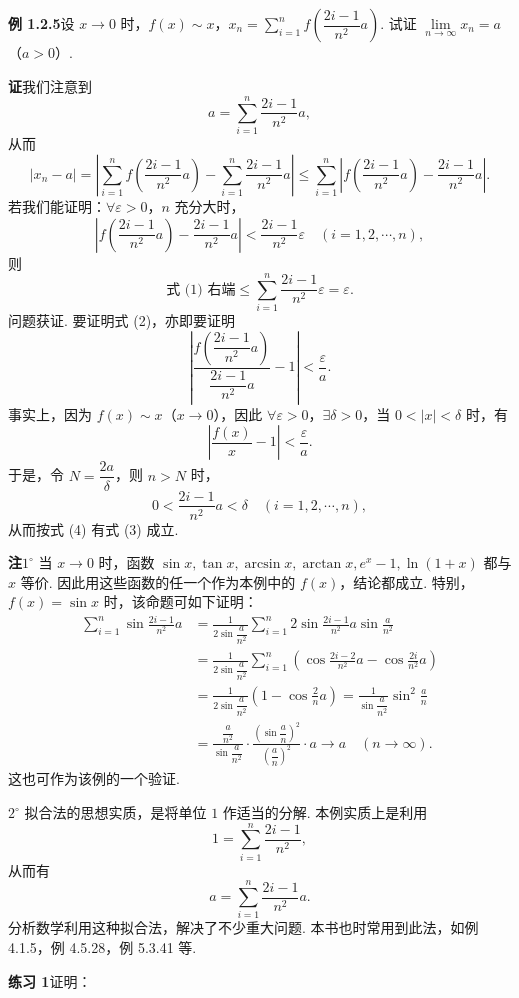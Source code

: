 \documentclass[UTF8,12pt,a4paper,fontset=fandol]{ctexart}
\begin{document}
\noindent\textbf{例 1.2.5}\quad 设 $x\to0$ 时，$f(x)\sim x$，$x_n=\sum\limits_{i=1}^n f\left(\dfrac{2i-1}{n^2}a\right)$. 试证 $\lim\limits_{n\to\infty}x_n=a$（$a>0$）.

\noindent\textbf{证}\quad 我们注意到
\[
  a=\sum_{i=1}^n\frac{2i-1}{n^2}a,
\]
从而
\[
  |x_n-a|
  =\left|\sum_{i=1}^n f\left(\frac{2i-1}{n^2}a\right)
  -\sum_{i=1}^n\frac{2i-1}{n^2}a\right|
  \le \sum_{i=1}^n\left|f\left(\frac{2i-1}{n^2}a\right)-\frac{2i-1}{n^2}a\right|.
\tag{1}
\]
若我们能证明：$\forall\varepsilon>0$，$n$ 充分大时，
\[
  \left|f\left(\frac{2i-1}{n^2}a\right)-\frac{2i-1}{n^2}a\right|
  <\frac{2i-1}{n^2}\varepsilon\quad(i=1,2,\cdots,n),
\tag{2}
\]
则
\[
  \text{式 (1) 右端}\le \sum_{i=1}^n\frac{2i-1}{n^2}\varepsilon=\varepsilon.
\]
问题获证. 要证明式 (2)，亦即要证明
\[
  \left|\frac{f\left(\dfrac{2i-1}{n^2}a\right)}{\dfrac{2i-1}{n^2}a}-1\right|<\frac\varepsilon a.
\tag{3}
\]
事实上，因为 $f(x)\sim x$（$x\to0$），因此 $\forall\varepsilon>0$，$\exists\delta>0$，当 $0<|x|<\delta$ 时，有
\[
  \left|\frac{f(x)}x-1\right|<\frac\varepsilon a.
\tag{4}
\]
于是，令 $N=\dfrac{2a}{\delta}$，则 $n>N$ 时，
\[
  0<\frac{2i-1}{n^2}a<\delta\quad(i=1,2,\cdots,n),
\]
从而按式 (4) 有式 (3) 成立.

\noindent\textbf{注}\quad $1^\circ$ 当 $x\to0$ 时，函数 $\sin x,\tan x,\arcsin x,\arctan x,e^x-1,\ln(1+x)$ 都与 $x$ 等价. 因此用这些函数的任一个作为本例中的 $f(x)$，结论都成立. 特别，$f(x)=\sin x$ 时，该命题可如下证明：
\[
\begin{aligned}
\sum_{i=1}^n\sin\frac{2i-1}{n^2}a
&=\frac1{2\sin\dfrac a{n^2}}\sum_{i=1}^n2\sin\frac{2i-1}{n^2}a\sin\frac a{n^2}\\
&=\frac1{2\sin\dfrac a{n^2}}\sum_{i=1}^n\left(\cos\frac{2i-2}{n^2}a-\cos\frac{2i}{n^2}a\right)\\
&=\frac1{2\sin\dfrac a{n^2}}\left(1-\cos\frac2n a\right)
=\frac1{\sin\dfrac a{n^2}}\sin^2\frac an\\
&=\frac{\dfrac a{n^2}}{\sin\dfrac a{n^2}}\cdot
\frac{\left(\sin\dfrac an\right)^2}{\left(\dfrac an\right)^2}\cdot a
\to a\quad(n\to\infty).
\end{aligned}
\]
这也可作为该例的一个验证.

$2^\circ$ 拟合法的思想实质，是将单位 $1$ 作适当的分解. 本例实质上是利用
\[
  1=\sum_{i=1}^n\frac{2i-1}{n^2},
\]
从而有
\[
  a=\sum_{i=1}^n\frac{2i-1}{n^2}a.
\]
分析数学利用这种拟合法，解决了不少重大问题. 本书也时常用到此法，如例 4.1.5，例 4.5.28，例 5.3.41 等.

\noindent\textbf{练习 1}\quad 证明：
\end{document}

